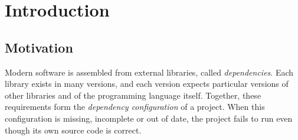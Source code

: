 \chapter{Introduction}\label{ch:introduction}

\section{Motivation}\label{sec:motivation}

Modern software is assembled from external libraries, called \emph{dependencies}. Each library exists in many versions, and each version expects particular versions of other libraries and of the programming language itself. Together, these requirements form the \emph{dependency configuration} of a project. When this configuration is missing, incomplete or out of date, the project fails to run even though its own source code is correct.

